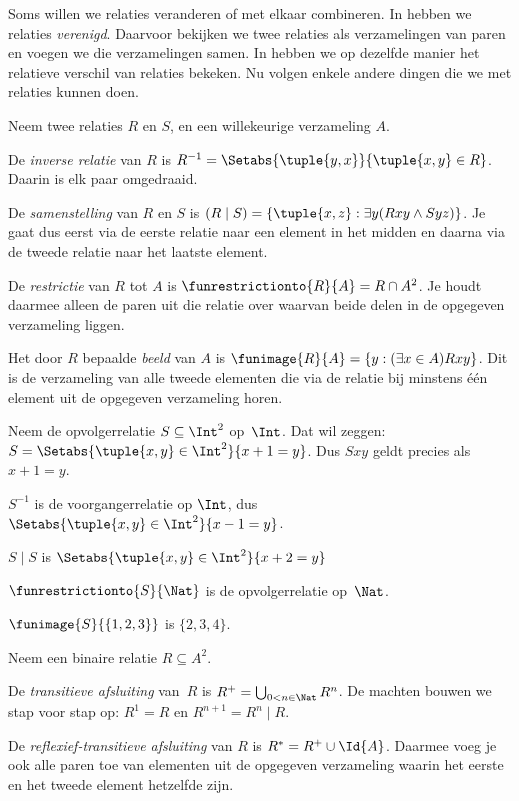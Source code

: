 \documentclass[../../../include/open-logic-section]{subfiles}
\begin{document}

Soms willen we relaties veranderen of met elkaar combineren. In
 hebben we relaties \emph{verenigd}.
Daarvoor bekijken we twee relaties als verzamelingen van paren en voegen we die
verzamelingen samen. In  hebben we
op dezelfde manier het relatieve verschil van relaties bekeken. Nu volgen
enkele andere dingen die we met relaties kunnen doen.

\begin{defn} 
Neem twee relaties $R$ en $S$, en een willekeurige verzameling $A$.

De \emph{inverse relatie} van $R$ is $R^{-1} = \Setabs{\tuple{y, x}}{\tuple{x,
    y} \in R}$. Daarin is elk paar omgedraaid.

De \emph{samenstelling} van $R$ en $S$ is $(R \mid S) =
\{\tuple{x, z} : \exists y(Rxy \land Syz)\}$. Je gaat dus eerst via de
eerste relatie naar een element in het midden en daarna via de tweede relatie
naar het laatste element.

De \emph{restrictie} van $R$ tot $A$ is $\funrestrictionto{R}{A}= R
\cap A^2$. Je houdt daarmee alleen de paren uit die relatie over waarvan
beide delen in de opgegeven verzameling liggen.

Het door $R$ bepaalde \emph{beeld} van $A$ is $\funimage{R}{A} = \{y :
(\exists x \in A)Rxy\}$. Dit is de verzameling van alle tweede elementen die
via de relatie bij minstens één element uit de opgegeven verzameling horen.
\end{defn}

\begin{ex}
Neem de opvolgerrelatie $S \subseteq \Int^2$ op~$\Int$. Dat wil zeggen:
$S = \Setabs{\tuple{x, y} \in \Int^2}{x + 1 = y}$. Dus $Sxy$ geldt precies
als $x + 1 = y$.

$S^{-1}$ is de voorgangerrelatie op $\Int$, dus
$\Setabs{\tuple{x,y}\in\Int^2}{x -1 =y}$.

$S\mid S$ is
$ \Setabs{\tuple{x,y}\in\Int^2}{x + 2 =y}$

$\funrestrictionto{S}{\Nat}$ is de opvolgerrelatie op~$\Nat$.

$\funimage{S}{\{1,2,3\}}$ is $\{2, 3, 4\}$.
\end{ex}

\begin{defn}Neem een binaire relatie $R \subseteq A^2$.
	
De \emph{transitieve afsluiting} van~$R$ is $R^+ = \bigcup_{0 < n \in
\Nat} R^n$. De machten bouwen we stap voor stap op: $R^1 = R$ en
$R^{n+1} = R^n \mid R$.

De \emph{reflexief-transitieve afsluiting} van $R$ is $R^* = R^+ \cup
\Id{A}$. Daarmee voeg je ook alle paren toe van elementen uit de opgegeven
verzameling waarin het eerste en het tweede element hetzelfde zijn.
\end{defn}
\end{document}
